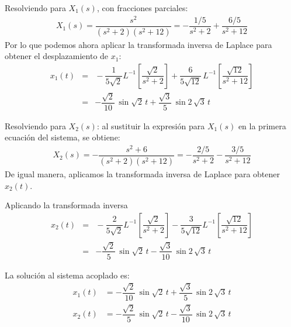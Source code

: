 Resolviendo para $X_{1}(s)$, con fracciones parciales:
\begin{align*}
X_{1}(s) = \dfrac{s^{2}}{(s^{2} + 2)(s^{2} + 12)} = - \dfrac{1/5}{s^{2} + 2} + \dfrac{6/5}{s^{2} + 12}
\end{align*}
Por lo que podemos ahora aplicar la transformada inversa de Laplace para obtener el desplazamiento de $x_{1}$:
\begin{eqnarray*}
x_{1}(t) &=& \! -\dfrac{1}{5 \sqrt{2}} L^{-1} \left[ \dfrac{\sqrt{2}}{s^{2} + 2} \right] {+} \dfrac{6}{5 \sqrt{12}} \, L^{-1} \left[ \dfrac{\sqrt{12}}{s^{2} + 12} \right] \\[0.5em] 
&=& - \dfrac{\sqrt{2}}{10} \, \sin \sqrt{2} \, t + \dfrac{\sqrt{3}}{5} \, \sin 2 \, \sqrt{3} \, t
\end{eqnarray*}

Resolviendo para $X_{2}(s)$: al sustituir la expresión para $X_{1}(s)$ en la primera ecuación del sistema, se obtiene:
\begin{align*}
X_{2}(s) = - \dfrac{s^{2} + 6}{(s^{2} + 2)(s^{2} + 12)} = - \dfrac{2/5}{s^{2} + 2} - \dfrac{3/5}{s^{2} + 12}
\end{align*}
De igual manera, aplicamos la transformada inversa de Laplace para obtener $x_{2}(t)$.

Aplicando la transformada inversa
\begin{eqnarray*}
x_{2}(t) &=& \! -\dfrac{2}{5 \sqrt{2}} L^{-1} \left[ \dfrac{\sqrt{2}}{s^{2} + 2} \right] {-} \dfrac{3}{5 \sqrt{12}} L^{-1} \left[ \dfrac{\sqrt{12}}{s^{2} + 12} \right] \\[0.5em] 
&=& - \dfrac{\sqrt{2}}{5} \, \sin \sqrt{2} \, t - \dfrac{\sqrt{3}}{10} \, \sin 2 \, \sqrt{3} \, t
\end{eqnarray*}

La solución al sistema acoplado es:
\begin{align*}
x_{1}(t) &= - \dfrac{\sqrt{2}}{10} \, \sin \sqrt{2} \, t + \dfrac{\sqrt{3}}{5} \, \sin 2 \, \sqrt{3} \, t \\[0.5em]
x_{2}(t) &= - \dfrac{\sqrt{2}}{5} \, \sin \sqrt{2} \, t - \dfrac{\sqrt{3}}{10} \, \sin 2 \, \sqrt{3} \, t
\end{align*}

